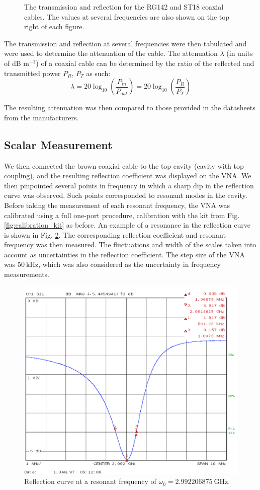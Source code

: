 \documentclass[a4paper]{report}
\numberwithin{equation}{section}
\begin{document}
\begin{figure}[htb!]
	\caption{The transmission and reflection for the RG142 and ST18 coaxial
	cables. The values at several frequencies are also shown on the top right of
	each figure. }
	\label{fig:calib_raw}
\end{figure}

The transmission and reflection at several frequencies were then tabulated and were used to determine the attenuation
of the cable. The attenuation $\lambda$ (in units of dB m$^{-1}$) of a coaxial cable can be determined by the ratio of the
reflected and transmitted power $P_R$, $P_T$ as such:
\begin{equation}
	\lambda = 20 \log_{10}\left(\frac{P_{in}}{P_{out}}\right) = 20 \log_{10}\left(\frac{P_R}{P_T}\right)
\end{equation} 

The resulting attenuation was then compared to those provided in the datasheets
from the manufacturers.\par 

\subsection{Scalar Measurement}

We then connected the brown coaxial cable to the top cavity (cavity with top
coupling), and the resulting reflection coefficient was displayed on the VNA.
We then pinpointed several points in frequency in which a sharp dip in the
reflection curve was observed. Such points corresponded to 
resonant modes in the cavity. Before taking the measurement of each resonant frequency, the VNA was calibrated
using a full one-port procedure, calibration with the kit from Fig.
\ref{fig:calibration_kit} as before. An example of a resonance in the
reflection curve is shown in Fig. \ref{fig:resonance_raw}. The corresponding
reflection coefficient and resonant frequency was then measured. The
fluctuations and width of the scales taken into account as uncertainties in the
reflection coefficient. The step size of the VNA was $\SI{50}{\kilo\hertz}$, which was also considered as the
uncertainty in frequency measurements.
\par 

\begin{figure}[htb!]
	\centering
	\includegraphics[width=0.6\columnwidth]{resonant1.1.png}
	\caption{Reflection curve at a resonant frequency of $\omega_0 =
	\SI{2.992206875}{\giga\hertz}$. }

	\label{fig:resonance_raw}
\end{figure}
\end{document}
